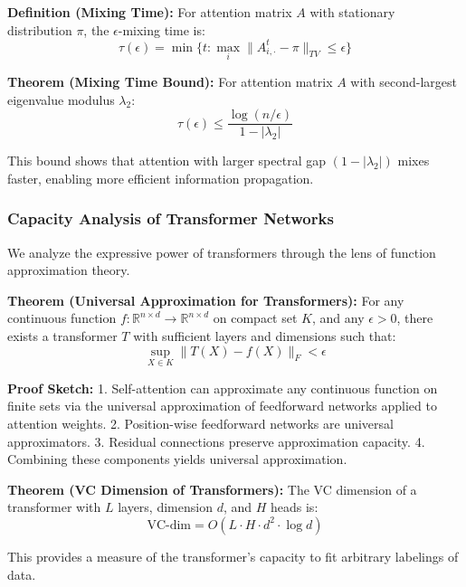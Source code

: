 \textbf{Definition (Mixing Time):} For attention matrix $A$ with stationary distribution $\pi$, the $\epsilon$-mixing time is:
\begin{equation}
\tau(\epsilon) = \min\{t : \max_{i} \|A^t_{i,\cdot} - \pi\|_{TV} \leq \epsilon\}
\end{equation}

\textbf{Theorem (Mixing Time Bound):} For attention matrix $A$ with second-largest eigenvalue modulus $\lambda_2$:
\begin{equation}
\tau(\epsilon) \leq \frac{\log(n/\epsilon)}{1 - |\lambda_2|}
\end{equation}

This bound shows that attention with larger spectral gap $(1 - |\lambda_2|)$ mixes faster, enabling more efficient information propagation.

\subsubsection{Capacity Analysis of Transformer Networks}

We analyze the expressive power of transformers through the lens of function approximation theory.

\textbf{Theorem (Universal Approximation for Transformers):} For any continuous function $f: \mathbb{R}^{n \times d} \rightarrow \mathbb{R}^{n \times d}$ on compact set $K$, and any $\epsilon > 0$, there exists a transformer $T$ with sufficient layers and dimensions such that:
\begin{equation}
\sup_{X \in K} \|T(X) - f(X)\|_F < \epsilon
\end{equation}

\textbf{Proof Sketch:}
1. Self-attention can approximate any continuous function on finite sets via the universal approximation of feedforward networks applied to attention weights.
2. Position-wise feedforward networks are universal approximators.
3. Residual connections preserve approximation capacity.
4. Combining these components yields universal approximation.

\textbf{Theorem (VC Dimension of Transformers):} The VC dimension of a transformer with $L$ layers, dimension $d$, and $H$ heads is:
\begin{equation}
\text{VC-dim} = O(L \cdot H \cdot d^2 \cdot \log d)
\end{equation}

This provides a measure of the transformer's capacity to fit arbitrary labelings of data.

